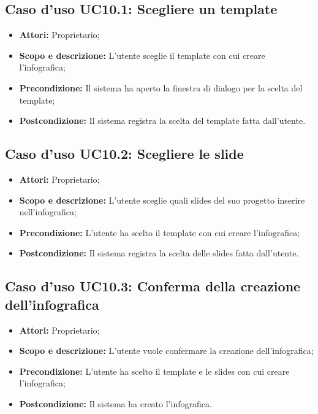\subsection{Caso d'uso UC10.1: Scegliere un template}
\begin{itemize}
	\item \textbf{Attori:} Proprietario;
	\item \textbf{Scopo e descrizione:} L'utente sceglie il \gls{template} con cui creare l'\gls{infografica};
	\item \textbf{Precondizione:} Il sistema ha aperto la finestra di dialogo per la scelta del \gls{template};
	\item \textbf{Postcondizione:} Il sistema registra la scelta del \gls{template} fatta dall'utente.
\end{itemize}


\subsection{Caso d'uso UC10.2: Scegliere le slide}
\begin{itemize}
\item \textbf{Attori:} Proprietario;
\item \textbf{Scopo e descrizione:} L'utente sceglie quali \gls{slides} del suo progetto inserire nell'\gls{infografica};
\item \textbf{Precondizione:} L'utente ha scelto il \gls{template} con cui creare l'\gls{infografica};
\item \textbf{Postcondizione:} Il sistema registra la scelta delle \gls{slides} fatta dall'utente.
\end{itemize}


\subsection{Caso d'uso UC10.3: Conferma della creazione dell'infografica}
\begin{itemize}
\item \textbf{Attori:} Proprietario;
\item \textbf{Scopo e descrizione:} L'utente vuole confermare la creazione dell'\gls{infografica};
\item \textbf{Precondizione:} L'utente ha scelto il \gls{template} e le \gls{slides} con cui creare l'\gls{infografica};
\item \textbf{Postcondizione:} Il sistema ha creato l'\gls{infografica}.
\end{itemize}

